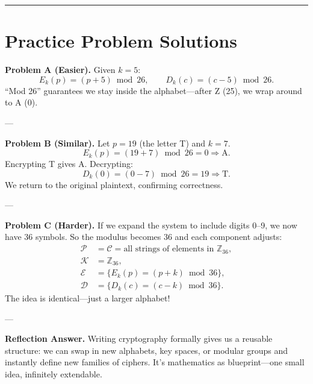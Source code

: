 \documentclass[12pt]{article}
\begin{document}
\bigskip
\hrule
\vspace{0.5em}

\section*{Practice Problem Solutions}

\textbf{Problem A (Easier).}  
Given \(k=5\):
\[
E_k(p) = (p+5)\bmod 26,\qquad D_k(c) = (c-5)\bmod 26.
\]
“Mod 26” guarantees we stay inside the alphabet—after Z (25), we wrap around to A (0).

---

\textbf{Problem B (Similar).}  
Let \(p=19\) (the letter T) and \(k=7\).
\[
E_k(p) = (19+7)\bmod 26 = 0 \Rightarrow \text{A}.
\]
Encrypting T gives A.  
Decrypting:
\[
D_k(0) = (0-7)\bmod 26 = 19 \Rightarrow \text{T}.
\]
We return to the original plaintext, confirming correctness.

---

\textbf{Problem C (Harder).}  
If we expand the system to include digits 0–9, we now have 36 symbols.  
So the modulus becomes 36 and each component adjusts:
\[
\begin{aligned}
\mathcal{P} &= \mathcal{C} = \text{all strings of elements in } \mathbb{Z}_{36},\\
\mathcal{K} &= \mathbb{Z}_{36},\\
\mathcal{E} &= \{E_k(p) = (p+k)\bmod 36\},\\
\mathcal{D} &= \{D_k(c) = (c-k)\bmod 36\}.
\end{aligned}
\]
The idea is identical—just a larger alphabet!

---

\textbf{Reflection Answer.}  
Writing cryptography formally gives us a reusable structure: we can swap in new alphabets, key spaces, or modular groups and instantly define new families of ciphers.  
It’s mathematics as blueprint—one small idea, infinitely extendable.
\end{document}
